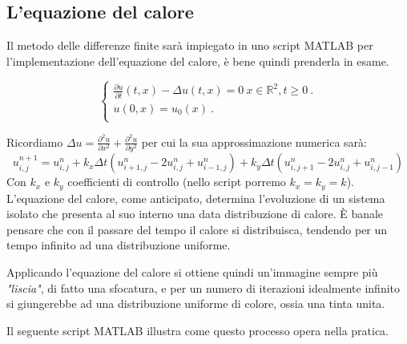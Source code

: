 \newpage

\subsection{L'equazione del calore}

\raggedright

Il metodo delle differenze finite sarà impiegato in uno script MATLAB per l'implementazione dell'equazione del calore, è bene quindi prenderla in esame.


$$
\begin{cases}
\frac{\partial u}{\partial t}(t,x)-\Delta u(t,x) = 0 \ x \in \mathbb R^2, t\ge 0 \ .\\ 
u(0,x) = u_0(x)\ . \\
\end{cases}
$$

Ricordiamo $\Delta u=\frac{\partial^2u}{\partial x^2}+\frac{\partial^2u}{\partial y^2}$ per cui la sua approssimazione numerica sarà:
$$
u_{i,j}^{n+1}=u_{i,j}^{n}+k_x \Delta t(u_{i+1,j}^{n}-2u_{i,j}^{n}+u_{i-1,j}^{n})+k_y \Delta t(u_{i,j+1}^{n}-2u_{i,j}^{n}+u_{i,j-1}^{n})
$$
Con $k_x$ e $k_y$ coefficienti di controllo (nello script porremo $k_x=k_y=k$).\\
L'equazione del calore, come anticipato, determina l'evoluzione di un sistema isolato che presenta al suo interno una data distribuzione di calore. \`E banale pensare che con il passare del tempo il calore si distribuisca, tendendo per un tempo infinito ad una distribuzione uniforme.

\vspace{1em}

Applicando l'equazione del calore si ottiene quindi un'immagine sempre più \textit{"liscia"}, di fatto una sfocatura, e per un numero di iterazioni idealmente infinito si giungerebbe ad una distribuzione uniforme di colore, ossia una tinta unita.

\vspace{1em}

Il seguente script MATLAB illustra come questo processo opera nella pratica.

